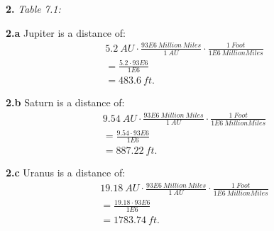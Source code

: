 \documentclass{report}
\begin{document}
    \bigbreak \noindent 
    \textbf{2.}
    \bigbreak \noindent 
    \textit{Table 7.1:}
    \begin{center}
        
    \end{center}


    \bigbreak \noindent 
    \textbf{2.a} Jupiter is a distance of:
    \begin{align*}
        5.2\ AU \cdot \frac{93E6\ Million\ Miles}{1\ AU} \cdot \frac{1\ Foot}{1E6\ Million Miles} \\
        = \frac{5.2 \cdot 93E6}{1E6} \\ 
        = 483.6\ ft
    .\end{align*}

    \bigbreak \noindent 
    \textbf{2.b} Saturn  is a distance of:
    \begin{align*}
        9.54\ AU \cdot \frac{93E6\ Million\ Miles}{1\ AU} \cdot \frac{1\ Foot}{1E6\ Million Miles} \\
        = \frac{9.54 \cdot 93E6}{1E6} \\ 
        = 887.22\ ft
    .\end{align*}

    \bigbreak \noindent 
    \textbf{2.c} Uranus is a distance of:
    \begin{align*}
        19.18\ AU \cdot \frac{93E6\ Million\ Miles}{1\ AU} \cdot \frac{1\ Foot}{1E6\ Million Miles} \\
        = \frac{19.18 \cdot 93E6}{1E6} \\ 
        = 1783.74\ ft
    .\end{align*}
\end{document}
